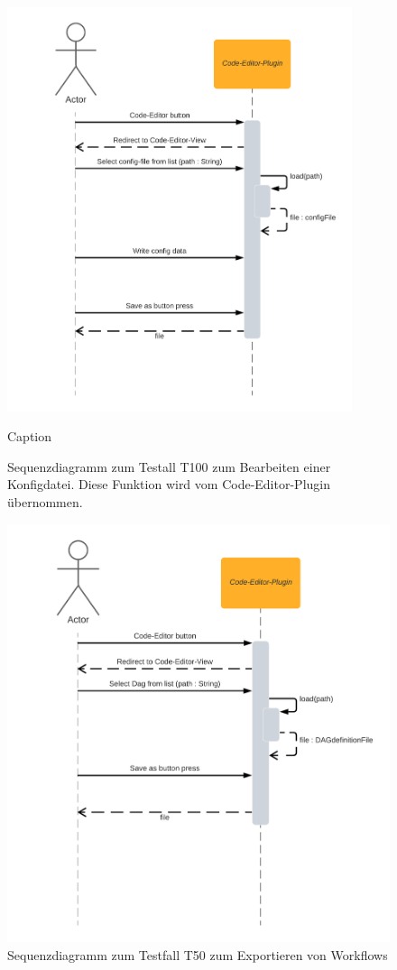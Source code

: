 \begin{figure}[ht]
    \centering
    \includegraphics[width=0.9\textwidth]{Diagramme/Sequenzdiagram T100.png}
    \caption{Caption}
    \label{fig:SQD_T100}
    \caption{Sequenzdiagramm zum Testall T100 zum Bearbeiten einer Konfigdatei. Diese Funktion wird vom Code-Editor-Plugin übernommen.}
\end{figure}

\begin{figure}[ht]
    \centering
    \includegraphics[width=\textwidth]{Diagramme/Sequenzdiagram T50.png}
    \caption{Sequenzdiagramm zum Testfall T50 zum Exportieren von Workflows}
    \label{fig:SQD_T50}
\end{figure}

